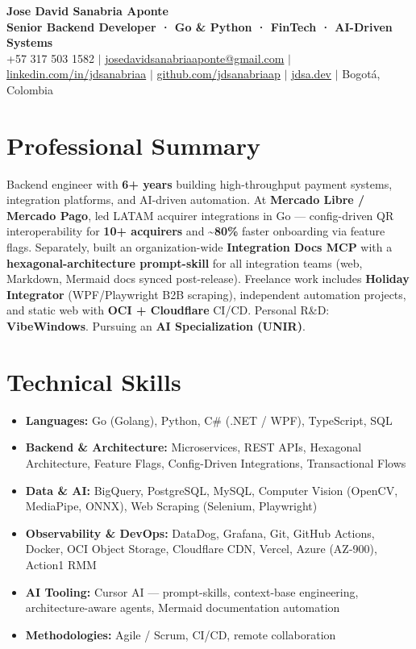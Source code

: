 
\begin{center}
  {\Huge \textbf{Jose David Sanabria Aponte}} \\[3pt]
  {\large \textcolor{accent}{\textbf{Senior Backend Developer · Go \& Python · FinTech · AI-Driven Systems}}} \\[4pt]
  \small
  +57 317 503 1582 \;$|$\;
  \href{mailto:josedavidsanabriaaponte@gmail.com}{josedavidsanabriaaponte@gmail.com} \;$|$\;
  \href{https://linkedin.com/in/jdsanabriaa}{linkedin.com/in/jdsanabriaa} \;$|$\;
  \href{https://github.com/jdsanabriaap}{github.com/jdsanabriaap} \;$|$\;
  \href{https://jdsa.dev}{jdsa.dev} \;$|$\;
  Bogotá, Colombia
\end{center}

\vspace{-4pt}

\section*{Professional Summary}

Backend engineer with \textbf{6+ years} building high-throughput payment systems, integration platforms,
and AI-driven automation. At \textbf{Mercado Libre / Mercado Pago}, led LATAM acquirer integrations in Go
— config-driven QR interoperability for \textbf{10+ acquirers} and \textbf{\textasciitilde{}80\%} faster
onboarding via feature flags. Separately, built an organization-wide \textbf{Integration Docs MCP} with a
\textbf{hexagonal-architecture prompt-skill} for all integration teams (web, Markdown, Mermaid docs synced
post-release). Freelance work includes \textbf{Holiday Integrator} (WPF/Playwright B2B scraping), independent
automation projects, and static web with \textbf{OCI + Cloudflare} CI/CD. Personal R\&D: \textbf{VibeWindows}.
Pursuing an \textbf{AI Specialization (UNIR)}.

\section*{Technical Skills}

\begin{itemize}
  \item \textbf{Languages:} Go (Golang), Python, C\# (.NET / WPF), TypeScript, SQL
  \item \textbf{Backend \& Architecture:} Microservices, REST APIs, Hexagonal Architecture, Feature Flags, Config-Driven Integrations, Transactional Flows
  \item \textbf{Data \& AI:} BigQuery, PostgreSQL, MySQL, Computer Vision (OpenCV, MediaPipe, ONNX), Web Scraping (Selenium, Playwright)
  \item \textbf{Observability \& DevOps:} DataDog, Grafana, Git, GitHub Actions, Docker, OCI Object Storage, Cloudflare CDN, Vercel, Azure (AZ-900), Action1 RMM
  \item \textbf{AI Tooling:} Cursor AI — prompt-skills, context-base engineering, architecture-aware agents, Mermaid documentation automation
  \item \textbf{Methodologies:} Agile / Scrum, CI/CD, remote collaboration
\end{itemize}

